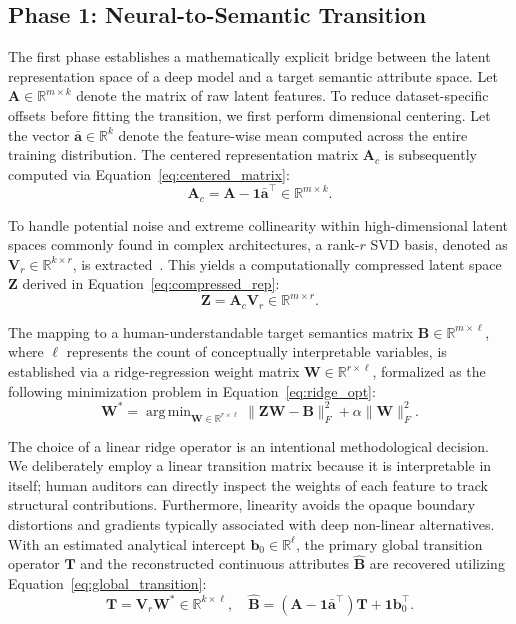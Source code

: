 \documentclass[make,article,submit,pdftex,moreauthors]{Definitions/mdpi}
\newcommand{\matA}{\mathbf{A}}
\newcommand{\matB}{\mathbf{B}}
\newcommand{\hatB}{\widehat{\mathbf{B}}}
\newcommand{\matT}{\mathbf{T}}
\newcommand{\matW}{\mathbf{W}}
\newcommand{\matZ}{\mathbf{Z}}
\newcommand{\matV}{\mathbf{V}}
\newcommand{\R}{\mathbb{R}}
\DeclareMathOperator*{\argmin}{arg\,min}
\begin{document}
\subsection{Phase 1: Neural-to-Semantic Transition}
\label{subsec:transition_matrix}

The first phase establishes a mathematically explicit bridge between the latent representation space of a deep model and a target semantic attribute space. Let $\matA \in \R^{m \times k}$ denote the matrix of raw latent features. To reduce dataset-specific offsets before fitting the transition, we first perform dimensional centering. Let the vector $\bar{\mathbf{a}} \in \R^{k}$ denote the feature-wise mean computed across the entire training distribution. The centered representation matrix $\matA_c$ is subsequently computed via Equation~\eqref{eq:centered_matrix}:
\begin{equation}
 \label{eq:centered_matrix}
 \matA_c = \matA - \mathbf{1}\bar{\mathbf{a}}^{\top} \in \R^{m \times k}.
\end{equation}

To handle potential noise and extreme collinearity within high-dimensional latent spaces commonly found in complex architectures, a rank-$r$ SVD basis, denoted as $\matV_r \in \R^{k \times r}$, is extracted~\cite{Halko2011RandomizedSVD}. This yields a computationally compressed latent space $\matZ$ derived in Equation~\eqref{eq:compressed_rep}:
\begin{equation}
 \label{eq:compressed_rep}
 \matZ = \matA_c\matV_r \in \R^{m \times r}.
\end{equation}

The mapping to a human-understandable target semantics matrix $\matB \in \R^{m \times \ell}$, where $\ell$ represents the count of conceptually interpretable variables, is established via a ridge-regression weight matrix $\matW \in \R^{r \times \ell}$, formalized as the following minimization problem in Equation~\eqref{eq:ridge_opt}:
\begin{equation}
 \label{eq:ridge_opt}
 \matW^{\ast} = \argmin_{\matW \in \R^{r \times \ell}} \|\matZ\matW - \matB\|_F^2 + \alpha\|\matW\|_F^2.
\end{equation}

The choice of a linear ridge operator is an intentional methodological decision. We deliberately employ a linear transition matrix because it is interpretable in itself; human auditors can directly inspect the weights of each feature to track structural contributions. Furthermore, linearity avoids the opaque boundary distortions and gradients typically associated with deep non-linear alternatives. With an estimated analytical intercept $\mathbf{b}_0 \in \R^{\ell}$, the primary global transition operator $\matT$ and the reconstructed continuous attributes $\hatB$ are recovered utilizing Equation~\eqref{eq:global_transition}:
\begin{equation}
 \label{eq:global_transition}
 \matT = \matV_r\matW^{\ast} \in \R^{k \times \ell}, \quad \hatB = (\matA - \mathbf{1}\bar{\mathbf{a}}^{\top})\matT + \mathbf{1}\mathbf{b}_0^{\top}.
\end{equation}
\end{document}

